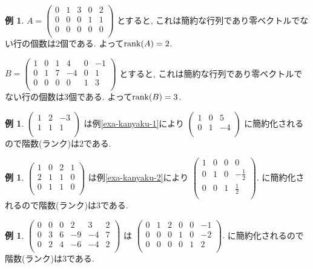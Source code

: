 \documentclass[dvipdfmx,a4paper,11pt]{article}
\theoremstyle{definition}
\newtheorem{exa}[thm]{例}
\begin{document}
 
 \begin{exa}
$A=
 \begin{pmatrix}
 0& 1& 3  & 0&2\\
 0& 0& 0  & 1&1\\
 0& 0& 0 & 0&0\\
 \end{pmatrix}
 $
 とすると, これは簡約な行列であり零ベクトルでない行の個数は2個である. よって${\rm rank}(A)=2$.
 
 $B= \begin{pmatrix}
 1& 0& 1  & 4&0&-1\\
 0& 1& 7 & -4&0&1\\
 0& 0& 0 & 0&1&3\\
 \end{pmatrix}
 $ とすると, これは簡約な行列であり零ベクトルでない行の個数は3個である. よって${\rm rank}(B)=3$.
\end{exa}

\begin{exa}
$
 \begin{pmatrix}
 1& 2& -3  \\
 1& 1& 1  \\
 \end{pmatrix}
 $
 は例\ref{exa-kanyaku-1}により
 $
    \begin{pmatrix}
 1& 0& 5  \\
 0& 1& -4  \\
 \end{pmatrix}
 $
 に簡約化されるので階数(ランク)は2である.
\end{exa}

\begin{exa}
$
 \begin{pmatrix}
 1& 0& 2  &1\\
 2& 1& 1  &0\\
 0& 1& 1  &0\\
 \end{pmatrix}
 $
 は例\ref{exa-kanyaku-2}により
 $
  \begin{pmatrix}
 1& 0& 0  &0\\
 0& 1& 0 &-\frac{1}{2}\\
 0& 0& 1 &\frac{1}{2}\\
 \end{pmatrix}.
 $
 に簡約化されるので階数(ランク)は3である.
\end{exa}

\begin{exa}
$
 \begin{pmatrix}
 0& 0& 0  &2 & 3 & 2\\
 0& 3& 6  &-9 & -4 & 7\\
 0& 2& 4  &-6 & -4 & 2\\
 \end{pmatrix}
 $
は
 $
  \begin{pmatrix}
 0& 1& 2  &0 & 0 & -1\\
 0& 0& 0  &1 & 0 &-2\\
 0& 0& 0 &0 & 1 & 2\\
 \end{pmatrix}.
 $
 に簡約化されるので階数(ランク)は3である.
\end{exa}
\end{document}
